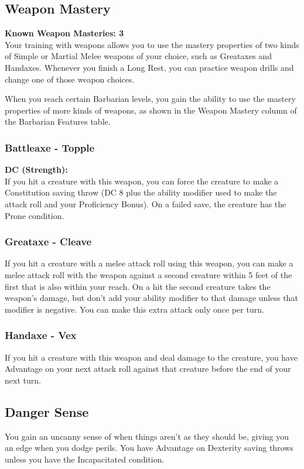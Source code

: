 \documentclass[letterpaper,openany,oneside,twocolumn]{book}
\begin{document}
\subsection*{Weapon Mastery}
\textbf{Known Weapon Masteries: 3}\\
Your training with weapons allows you to use the mastery properties of two kinds of Simple or Martial Melee weapons of your choice, such as Greataxes and Handaxes. Whenever you finish a Long Rest, you can practice weapon drills and change one of those weapon choices.

When you reach certain Barbarian levels, you gain the ability to use the mastery properties of more kinds of weapons, as shown in the Weapon Mastery column of the Barbarian Features table.
\subsubsection*{Battleaxe - Topple}
\textbf{DC (Strength): }\\
If you hit a creature with this weapon, you can force the creature to make a Constitution saving throw (DC 8 plus the ability modifier used to make the attack roll and your Proficiency Bonus). On a failed save, the creature has the Prone condition.
\subsubsection*{Greataxe - Cleave}
If you hit a creature with a melee attack roll using this weapon, you can make a melee attack roll with the weapon against a second creature within 5 feet of the first that is also within your reach. On a hit the second creature takes the weapon's damage, but don't add your ability modifier to that damage unless that modifier is negative. You can make this extra attack only once per turn.
\subsubsection*{Handaxe - Vex}
If you hit a creature with this weapon and deal damage to the creature, you have Advantage on your next attack roll against that creature before the end of your next turn.
\subsection*{Danger Sense}
You gain an uncanny sense of when things aren't as they should be, giving you an edge when you dodge perils. You have Advantage on Dexterity saving throws unless you have the Incapacitated condition.
\end{document}
